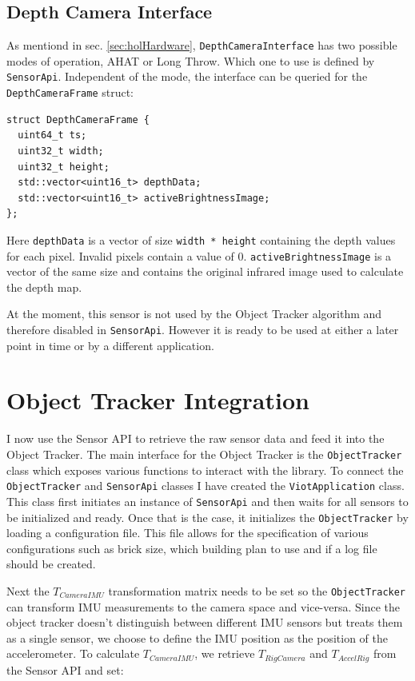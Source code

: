 \subsection{Depth Camera Interface}

As mentiond in sec. \ref{sec:holHardware}, \lstinline{DepthCameraInterface} has two possible modes of operation, AHAT or Long Throw. Which one to use is defined by \lstinline{SensorApi}. Independent of the mode, the interface can be queried  for the \lstinline{DepthCameraFrame} struct: 

\begin{lstlisting}
struct DepthCameraFrame {
  uint64_t ts;
  uint32_t width;
  uint32_t height;
  std::vector<uint16_t> depthData;
  std::vector<uint16_t> activeBrightnessImage;
};
\end{lstlisting}

Here \lstinline{depthData} is a vector of size \lstinline{width * height} containing the depth values for each pixel. Invalid pixels contain a value of 0. \lstinline{activeBrightnessImage} is a vector of the same size and contains the original infrared image used to calculate the depth map.

At the moment, this sensor is not used by the Object Tracker algorithm and therefore disabled in \lstinline{SensorApi}. However it is ready to be used at either a later point in time or by a different application.

\section{Object Tracker Integration}\label{sec:objectTrackerIntegration}

I now use the Sensor API to retrieve the raw sensor data and feed it into the Object Tracker. The main interface for the Object Tracker is the \lstinline{ObjectTracker} class which exposes various functions to interact with the library. To connect the \lstinline{ObjectTracker} and \lstinline{SensorApi} classes I have created the \lstinline{ViotApplication} class. This class first initiates an instance of \lstinline{SensorApi} and then waits for all sensors to be initialized and ready. Once that is the case, it initializes the \lstinline{ObjectTracker} by loading a configuration file. This file allows for the specification of various configurations such as brick size, which building plan to use and if a log file should be created.

Next the $T_{CameraIMU}$ transformation matrix needs to be set so the \lstinline{ObjectTracker} can transform IMU measurements to the camera space and vice-versa. Since the object tracker doesn't distinguish between different IMU sensors but treats them as a single sensor, we choose to define the IMU position as the position of the accelerometer. To calculate $T_{CameraIMU}$, we retrieve $T_{RigCamera}$ and $T_{AccelRig}$ from the Sensor API and set:

